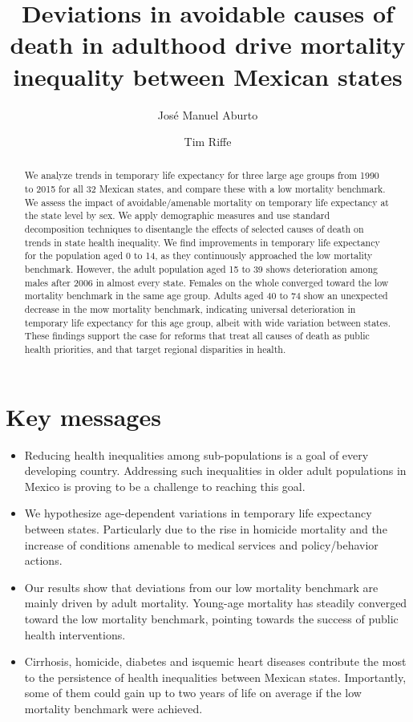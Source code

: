 \documentclass[11.5pt]{article}
\title{ Deviations in avoidable causes of death in adulthood drive mortality inequality between
Mexican states}
\author[1]{Jos\'e Manuel Aburto}
\author[2]{Tim Riffe}
\affil[1]{European Doctoral School of Demography}
\affil[1,2]{Max Planck Institute for Demographic Research}
\begin{document}
\maketitle

\begin{abstract}
We analyze trends in temporary life expectancy for three large age groups from 1990 to 2015 for all 32 Mexican states, and compare these with a low mortality benchmark. We assess the impact of avoidable/amenable mortality on temporary life expectancy at the state level by sex. We apply demographic measures and use standard decomposition techniques to disentangle the effects of selected causes of death on trends in state health inequality. We find improvements in temporary life expectancy for the population aged 0 to 14, as they continuously approached the low mortality benchmark. However, the adult population aged 15 to 39 shows deterioration among males after 2006 in almost every state. Females on the whole converged toward the low mortality benchmark in the same age group. Adults aged 40 to 74 show an unexpected decrease in the mow mortality benchmark, indicating universal deterioration in temporary life expectancy for this age group, albeit with wide variation between states. These findings support the case for reforms that treat all causes of death as public health priorities, and that target regional disparities in health.

\end{abstract}

\section*{Key messages}
\begin{itemize}
\item Reducing health inequalities among sub-populations is a goal of every developing country. Addressing such inequalities in older adult populations in Mexico is proving to be a challenge to reaching this goal.
\item We hypothesize age-dependent variations in temporary life expectancy between states. Particularly due to the rise in homicide mortality and the increase of conditions amenable to medical services and policy/behavior actions.
\item Our results show that deviations from our low mortality benchmark are mainly driven by adult mortality. Young-age mortality has steadily converged toward the low mortality benchmark, pointing towards the success of public health interventions.
\item Cirrhosis, homicide, diabetes and isquemic heart diseases contribute the most to the persistence of health inequalities between Mexican states. Importantly, some of them could gain up to two years of life on average if the low mortality benchmark were achieved.
\end{itemize}
\end{document}
